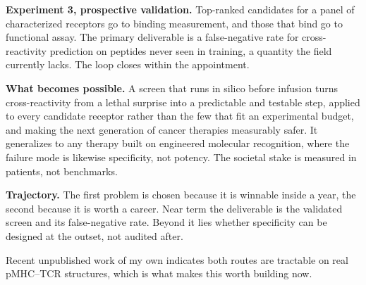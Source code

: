 \documentclass[letterpaper]{article}
\begin{document}
\noindent\textbf{Experiment 3, prospective validation.} Top-ranked candidates for a panel of characterized
receptors go to binding measurement, and those that bind go to functional assay. The primary deliverable
is a false-negative rate for cross-reactivity prediction on peptides never seen in training, a quantity
the field currently lacks. The loop closes within the appointment.

\noindent\textbf{What becomes possible.} A screen that runs in silico before infusion turns
cross-reactivity from a lethal surprise into a predictable and testable step, applied to every candidate
receptor rather than the few that fit an experimental budget, and making the next generation of cancer
therapies measurably safer. It generalizes to any therapy built on engineered molecular recognition,
where the failure mode is likewise specificity, not potency. The societal stake is measured in patients,
not benchmarks.

\noindent\textbf{Trajectory.} The first problem is chosen because it is winnable inside a year, the
second because it is worth a career. Near term the deliverable is the validated screen and its
false-negative rate. Beyond it lies whether specificity can be designed at the outset, not audited
after.

\noindent Recent unpublished work of my own indicates both routes are tractable on real pMHC--TCR
structures, which is what makes this worth building now.
\end{document}

